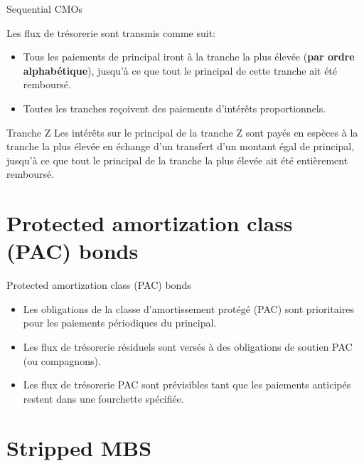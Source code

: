 \documentclass[10pt,a4paper]{beamer}
\begin{document}
\begin{frame}{Sequential CMOs}
\begin{block}{Les flux de trésorerie sont transmis comme suit:}
\begin{itemize}[label=\bullet]
\item Tous les paiements de principal iront à la tranche la plus élevée (\textbf{par ordre alphabétique}), jusqu'à ce que tout le principal de cette tranche ait été remboursé.
\item Toutes les tranches reçoivent des paiements d'intérêts proportionnels.
\end{itemize}
\end{block}

\begin{block}{Tranche Z}
Les intérêts sur le principal de la tranche Z sont payés en espèces à la tranche la plus élevée en échange d'un transfert d'un montant égal de principal, jusqu'à ce que tout le principal de la tranche la plus élevée ait été entièrement remboursé.
\end{block}
\end{frame}

\section{Protected amortization class (PAC) bonds}

\begin{frame}{Protected amortization class (PAC) bonds}
\begin{itemize}[label=\bullet]
\item Les obligations de la classe d'amortissement protégé (PAC) sont prioritaires pour les paiements périodiques du principal.

\vspace{0.5cm}


\item Les flux de trésorerie résiduels sont versés à des obligations de soutien PAC (ou compagnons).

\vspace{0.5cm}

\item Les flux de trésorerie PAC sont prévisibles tant que les paiements anticipés restent dans une fourchette spécifiée.
\end{itemize}
\end{frame}


\section{Stripped MBS}
\end{document}
